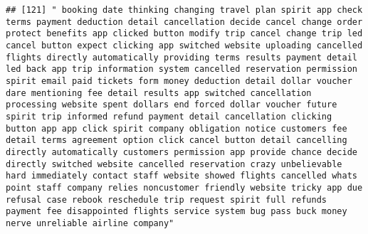 \documentclass[
]{article}
\begin{document}
\begin{verbatim}
## [121] " booking date thinking changing travel plan spirit app check terms payment deduction detail cancellation decide cancel change order protect benefits app clicked button modify trip cancel change trip led cancel button expect clicking app switched website uploading cancelled flights directly automatically providing terms results payment detail led back app trip information system cancelled reservation permission spirit email paid tickets form money deduction detail dollar voucher dare mentioning fee detail results app switched cancellation processing website spent dollars end forced dollar voucher future spirit trip informed refund payment detail cancellation clicking button app app click spirit company obligation notice customers fee detail terms agreement option click cancel button detail cancelling directly automatically customers permission app provide chance decide directly switched website cancelled reservation crazy unbelievable hard immediately contact staff website showed flights cancelled whats point staff company relies noncustomer friendly website tricky app due refusal case rebook reschedule trip request spirit full refunds payment fee disappointed flights service system bug pass buck money nerve unreliable airline company"                                                                                                                                                                                                                                                                                                                                                                                                                                                                                         

\end{verbatim}
\end{document}

